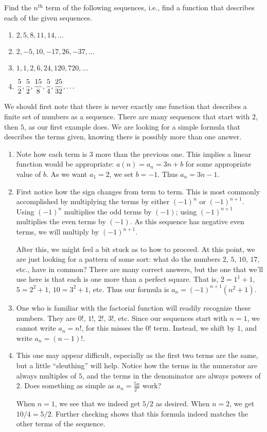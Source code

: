 \begin{example} \label{eg:7.1.2} %
Find the $n^\text{th}$ term of the following sequences, i.e., find a function that describes each of the given sequences.

\begin{enumerate}[1)]
\item $2, 5, 8, 11, 14, \ldots$
\item $2, -5, 10, -17, 26, -37, \ldots$
\item $1, 1, 2, 6, 24, 120, 720, \ldots$
\item $\displaystyle \frac52, \frac52, \frac{15}8, \frac54, \frac{25}{32}, \ldots$
\end{enumerate}

\solution We should first note that there is never exactly one function that describes a finite set of numbers as a sequence. There are many sequences that start with $2$, then $5$, as our first example does. We are looking for a simple formula that describes the terms given, knowing there is possibly more than one answer.
\begin{enumerate}[1)]
\item		Note how each term is $3$ more than the previous one. This implies a linear function would be appropriate: $a(n) = a_n = 3n + b$ for some appropriate value of $b$. As we want $a_1=2$, we set $b=-1$. Thus $a_n = 3n-1$.

\item		First notice how the sign changes from term to term. This is most commonly accomplished by multiplying the terms by either $(-1)^n$ or $(-1)^{n+1}$. Using $(-1)^n$ multiplies the odd terms by $(-1)$; using $(-1)^{n+1}$ multiplies the even terms by $(-1)$. As this sequence has negative even terms, we will multiply by $(-1)^{n+1}$. 

After this, we might feel a bit stuck as to how to proceed. At this point, we are just looking for a pattern of some sort: what do the numbers $2$, $5$, $10$, $17$, etc., have in common? There are many correct answers, but the one that we'll use here is that each is one more than a perfect square. That is, $2=1^1+1$, $5=2^2+1$, $10=3^2+1$, etc. Thus our formula is $a_n= (-1)^{n+1}(n^2+1)$.

\item		One who is familiar with the factorial function will readily recognize these numbers. They are $0!$, $1!$, $2!$, $3!$, etc. Since our sequences start with $n=1$, we cannot write $a_n = n!$, for this misses the $0!$ term. Instead, we shift by $1$, and write $a_n = (n-1)!$.

\item		This one may appear difficult, especially as the first two terms are the same, but a little ``sleuthing'' will help. Notice how the terms in the numerator are always multiples of $5$, and the terms in the denominator are always powers of $2$. Does something as simple as $a_n = \frac{5n}{2^n}$ work?

When $n=1$, we see that we indeed get $5/2$ as desired. When $n=2$, we get $10/4 = 5/2$. Further checking shows that this formula indeed matches the other terms of the sequence.
\end{enumerate}
\end{example}